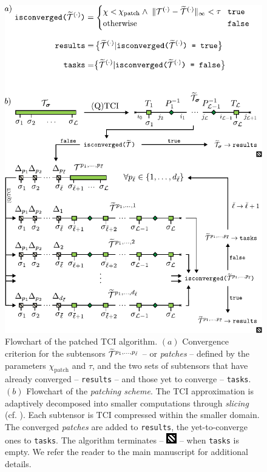 \begin{figure}[ht!]
	\includegraphics{figures/PatchingAlgorithm.pdf}
	\caption{Flowchart of the patched TCI algorithm. $(a)$ Convergence criterion for the subtensors $\widetilde{\mathcal{T}}^{p_1,\dots,p_{\bar \ell}}$ -- or \textit{patches} -- defined by the parameters $\chi_{\text{patch}}$ and $\tau$, and the two sets of subtensors that have already converged -- \texttt{results} -- and those yet to converge  -- \texttt{tasks}. $(b)$ Flowchart of the \textit{patching scheme}. The TCI approximation is adaptively decomposed into smaller computations through \textit{slicing} (cf. ). Each subtensor is TCI compressed within the smaller domain. The converged \textit{patches} are added to \texttt{results}, the yet-to-converge ones to \texttt{tasks}. The algorithm terminates -- \includegraphics[scale=0.95]{figures/TerminalSquare.pdf} -- when \texttt{tasks} is empty. We refer the reader to the main manuscript for additional details.}
	\label{fig:patchingAlg}
\end{figure}

